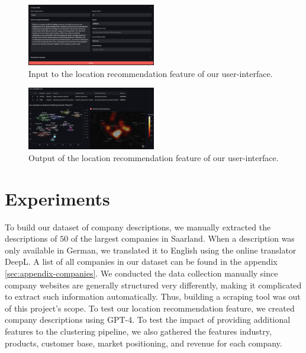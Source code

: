 \documentclass[conference]{IEEEtran}
\begin{document}
\begin{figure}[H]
	\centering
	\includegraphics[width=0.5\textwidth]{figures/location_recommendation_input.png}
	\caption{Input to the location recommendation feature of our user-interface.}
	\label{fig:location-recommendation-input}
\end{figure}
\begin{figure}[H]
	\centering
	\includegraphics[width=0.5\textwidth]{figures/location_recommendation_output.png}
	\caption{Output of the location recommendation feature of our user-interface.}
	\label{fig:location-recommendation-output}
\end{figure}

\section{Experiments}
To build our dataset of company descriptions, we manually extracted the descriptions of $50$ of the largest companies in Saarland. When a description was only available in German, we translated it to English using the online translator DeepL. A list of all companies in our dataset can be found in the appendix \ref{sec:appendix-companies}. We conducted the data collection manually since company websites are generally structured very differently, making it complicated to extract such information automatically. Thus, building a scraping tool was out of this project's scope. To test our location recommendation feature, we created company descriptions using GPT-4.
To test the impact of providing additional features to the clustering pipeline, we also gathered the features industry, products, customer base, market positioning, and revenue for each company.
\end{document}
